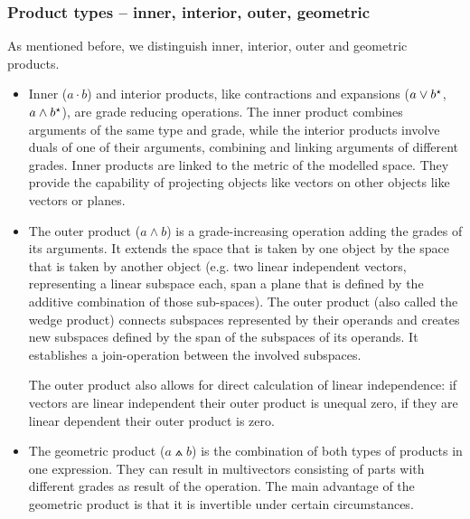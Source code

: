 \subsubsection{Product types -- inner, interior, outer, geometric}
\label{subsection:product_types}

As mentioned before, we distinguish inner, interior, outer and geometric products.
\begin{itemize}
    \item Inner ($a \cdot b$) and interior products, like contractions and expansions ($a
    \vee {b}^\star$, $a \wedge {b}^\star$), are grade reducing operations.
    The inner product combines arguments of the same type and grade, while the interior
    products involve duals of one of their arguments, combining and linking arguments of
    different grades. Inner products are linked to the metric of the modelled space. They
    provide the capability of projecting objects like vectors on other objects like
    vectors or planes.

    \item The outer product ($a \wedge b$) is a grade-increasing operation adding the
    grades of its arguments. It extends the space that is taken by one object by the space
    that is taken by another object (e.g. two linear independent vectors, representing a
    linear subspace each, span a plane that is defined by the additive combination of
    those sub-spaces). The outer product (also called the wedge product) connects
    subspaces represented by their operands and creates new subspaces defined by the span
    of the subspaces of its operands. It establishes a join-operation between the involved
    subspaces.
    
    The outer product also allows for direct calculation of linear
    independence: if vectors are linear independent their outer product is unequal
    zero, if they are linear dependent their outer product is zero.

    \item The geometric product ($a \wedgedot b$) is the combination of both types of
    products in one expression. They can result in multivectors consisting of parts with
    different grades as result of the operation. The main advantage of the geometric
    product is that it is invertible under certain circumstances.


\end{itemize}
